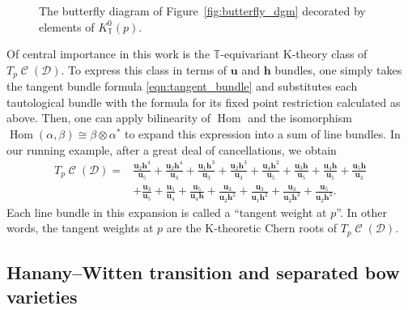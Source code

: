 \documentclass[11pt]{article}
\numberwithin{equation}{section}
\newcommand{\brane}{\mathcal D}
\newcommand{\torus}{\mathbb T}
\newcommand{\hb}{\mathbf h}
\newcommand{\ub}{\mathbf u}
\DeclareMathOperator{\bowvar}{\mathcal C}
\DeclareMathOperator{\Hom}{Hom}
\begin{document}
\begin{figure}[t]
\caption{The butterfly diagram of Figure~\ref{fig:butterfly_dgm} decorated by elements of $K^0_\torus(p)$.}
\label{fig:butterfly_mons}
\end{figure}

Of central importance in this work is the $\torus$-equivariant K-theory class of $T_p\bowvar(\brane)$. To express this class in terms of $\ub$ and $\hb$ bundles, one simply takes the tangent bundle formula \eqref{eqn:tangent_bundle} and substitutes each tautological bundle with the formula for its fixed point restriction calculated as above. Then, one can apply bilinearity of $\Hom$ and the isomorphism $\Hom(\alpha, \beta)\cong \beta\otimes\alpha^*$ to expand this expression into a sum of line bundles. In our running example, after a great deal of cancellations, we obtain
\begin{align}
T_p\bowvar(\brane) ={}& \frac{\ub_2\hb^4}{\ub_5} + \frac{\ub_2\hb^4}{\ub_3} + \frac{\ub_1\hb^3}{\ub_3} + \frac{\ub_2\hb^3}{\ub_3}
+ \frac{\ub_4\hb^2}{\ub_5} + \frac{\ub_3\hb}{\ub_5} + \frac{\ub_4\hb}{\ub_5} + \frac{\ub_5\hb}{\ub_3}\nonumber \\
& + \frac{\ub_3}{\ub_5}
+ \frac{\ub_5}{\ub_4} + \frac{\ub_5}{\ub_4\hb} + \frac{\ub_3}{\ub_2\hb^2} + \frac{\ub_3}{\ub_1\hb^2} + \frac{\ub_3}{\ub_2\hb^3}
+ \frac{\ub_5}{\ub_2\hb^3}.\label{eqn:cancel}
\end{align}
Each line bundle in this expansion is called a ``tangent weight at $p$''. In other words, the tangent weights at $p$ are the K-theoretic Chern roots of $T_p\bowvar(\brane)$.

\subsection{Hanany--Witten transition and separated bow varieties} \label{sec:HW}
\end{document}
